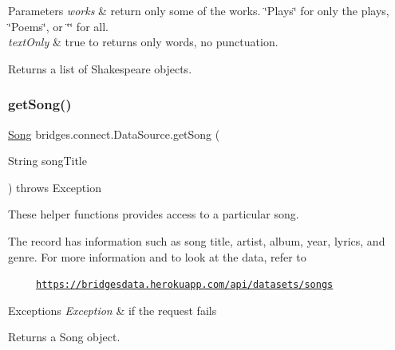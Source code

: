 \begin{DoxyParams}{Parameters}
{\em works} & return only some of the works. \char`\"{}\+Plays\char`\"{} for only the plays, \char`\"{}\+Poems\char`\"{}, or \char`\"{}\char`\"{} for all.\\
\hline
{\em text\+Only} & true to returns only words, no punctuation.\\
\hline
\end{DoxyParams}
\begin{DoxyReturn}{Returns}
a list of Shakespeare objects. 
\end{DoxyReturn}
\mbox{\label{classbridges_1_1connect_1_1_data_source_a4f49b088703c74d68bd854d40edc5ad4}} 
\subsubsection{\texorpdfstring{get\+Song()}{getSong()}\hspace{0.1cm}{\footnotesize\ttfamily [1/2]}}
{\footnotesize\ttfamily \hyperlink{classbridges_1_1data__src__dependent_1_1_song}{Song} bridges.\+connect.\+Data\+Source.\+get\+Song (\begin{DoxyParamCaption}\item[{String}]{song\+Title }\end{DoxyParamCaption}) throws Exception}

These helper functions provides access to a particular song.

The record has information such as song title, artist, album, year, lyrics, and genre. For more information and to look at the data, refer to 

~~~~~\href{https://bridgesdata.herokuapp.com/api/datasets/songs}{\tt https\+://bridgesdata.\+herokuapp.\+com/api/datasets/songs} 


\begin{DoxyExceptions}{Exceptions}
{\em Exception} & if the request fails\\
\hline
\end{DoxyExceptions}
\begin{DoxyReturn}{Returns}
a Song object. 
\end{DoxyReturn}
\mbox{\label{classbridges_1_1connect_1_1_data_source_a935ea2005b7de3cb22c1e55027b81460}} 
